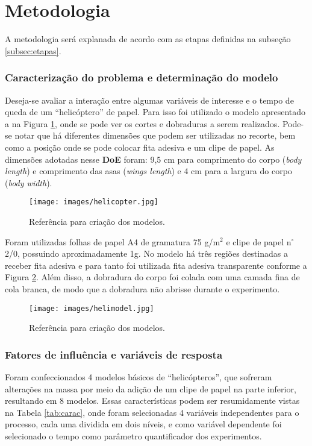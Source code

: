 \section{Metodologia}

A metodologia será explanada de acordo com as etapas definidas na subseção \ref{subsec:etapas}.

\subsubsection*{Caracterização do problema e determinação do modelo}

Deseja-se avaliar a interação entre algumas variáveis de interesse e o tempo de queda de um ``helicóptero'' de papel. Para isso foi utilizado o modelo apresentado a na Figura \ref{fig:helicopter}, onde se pode ver os cortes e dobraduras a serem realizados. Pode-se notar que há diferentes dimensões que podem ser utilizadas no recorte, bem como a posição onde se pode colocar fita adesiva e um clipe de papel. As dimensões adotadas nesse \textbf{DoE} foram: 9,5 cm para comprimento do corpo (\emph{body length}) e comprimento das asas (\emph{wings length}) e 4 cm para a largura do corpo (\emph{body width}).

\begin{figure}[h]
  \centering
  \caption{Referência para criação dos modelos.}
  \texttt{[image: images/helicopter.jpg]}
  \label{fig:helicopter}
\end{figure}

Foram utilizadas folhas de papel A4 de gramatura 75 g/m$^2$ e clipe de papel n$^\circ$ 2/0, possuindo aproximadamente 1g. No modelo há três regiões destinadas a receber fita adesiva e para tanto foi utilizada fita adesiva transparente conforme a Figura \ref{fig:helimodel}. Além disso, a dobradura do corpo foi colada com uma camada fina de cola branca, de modo que a dobradura não abrisse durante o experimento.

\begin{figure}[h]
  \centering
  \caption{Referência para criação dos modelos.}
  \texttt{[image: images/helimodel.jpg]}
  \label{fig:helimodel}
\end{figure}

\subsubsection*{Fatores de influência e variáveis de resposta}

Foram confeccionados 4 modelos básicos de ``helicópteros'', que sofreram alterações na massa por meio da adição de um clipe de papel na parte inferior, resultando em 8 modelos. Essas características podem ser resumidamente vistas na Tabela \ref{tab:carac}, onde foram selecionadas 4 variáveis independentes para o processo, cada uma dividida em dois níveis, e como variável dependente foi selecionado o tempo como parâmetro quantificador dos experimentos.

